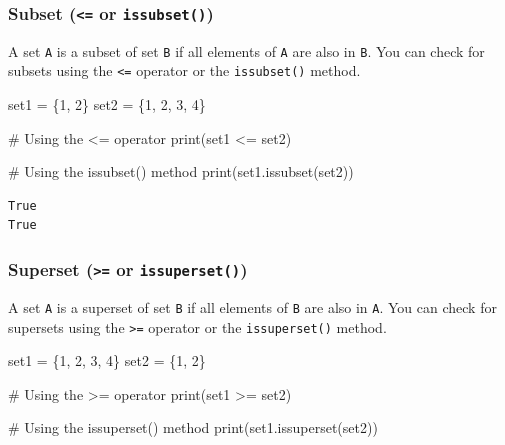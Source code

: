 \documentclass[
  letterpaper,
  DIV=11,
  numbers=noendperiod]{scrreprt}
\newenvironment{Shaded}{\begin{snugshade}}{\end{snugshade}}
\newcommand{\BuiltInTok}[1]{\textcolor[rgb]{0.00,0.23,0.31}{#1}}
\newcommand{\CommentTok}[1]{\textcolor[rgb]{0.37,0.37,0.37}{#1}}
\newcommand{\DecValTok}[1]{\textcolor[rgb]{0.68,0.00,0.00}{#1}}
\newcommand{\NormalTok}[1]{\textcolor[rgb]{0.00,0.23,0.31}{#1}}
\newcommand{\OperatorTok}[1]{\textcolor[rgb]{0.37,0.37,0.37}{#1}}
\begin{document}
\hypertarget{subset-or-issubset}{%
\subsubsection{\texorpdfstring{Subset (\texttt{\textless{}=} or
\texttt{issubset()})}{Subset (\textless= or issubset())}}\label{subset-or-issubset}}

A set \texttt{A} is a subset of set \texttt{B} if all elements of
\texttt{A} are also in \texttt{B}. You can check for subsets using the
\texttt{\textless{}=} operator or the \texttt{issubset()} method.

\begin{Shaded}
\begin{Highlighting}[]
\NormalTok{set1 }\OperatorTok{=}\NormalTok{ \{}\DecValTok{1}\NormalTok{, }\DecValTok{2}\NormalTok{\}}
\NormalTok{set2 }\OperatorTok{=}\NormalTok{ \{}\DecValTok{1}\NormalTok{, }\DecValTok{2}\NormalTok{, }\DecValTok{3}\NormalTok{, }\DecValTok{4}\NormalTok{\}}

\CommentTok{\# Using the \textless{}= operator}
\BuiltInTok{print}\NormalTok{(set1 }\OperatorTok{\textless{}=}\NormalTok{ set2) }

\CommentTok{\# Using the issubset() method}
\BuiltInTok{print}\NormalTok{(set1.issubset(set2))}
\end{Highlighting}
\end{Shaded}

\begin{verbatim}
True
True
\end{verbatim}

\hypertarget{superset-or-issuperset}{%
\subsubsection{\texorpdfstring{Superset (\texttt{\textgreater{}=} or
\texttt{issuperset()})}{Superset (\textgreater= or issuperset())}}\label{superset-or-issuperset}}

A set \texttt{A} is a superset of set \texttt{B} if all elements of
\texttt{B} are also in \texttt{A}. You can check for supersets using the
\texttt{\textgreater{}=} operator or the \texttt{issuperset()} method.

\begin{Shaded}
\begin{Highlighting}[]
\NormalTok{set1 }\OperatorTok{=}\NormalTok{ \{}\DecValTok{1}\NormalTok{, }\DecValTok{2}\NormalTok{, }\DecValTok{3}\NormalTok{, }\DecValTok{4}\NormalTok{\}}
\NormalTok{set2 }\OperatorTok{=}\NormalTok{ \{}\DecValTok{1}\NormalTok{, }\DecValTok{2}\NormalTok{\}}

\CommentTok{\# Using the \textgreater{}= operator}
\BuiltInTok{print}\NormalTok{(set1 }\OperatorTok{\textgreater{}=}\NormalTok{ set2)  }

\CommentTok{\# Using the issuperset() method}
\BuiltInTok{print}\NormalTok{(set1.issuperset(set2))  }
\end{Highlighting}
\end{Shaded}
\end{document}
